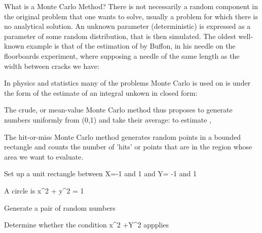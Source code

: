 What is a Monte Carlo Method?
There is not necessarily a random component in the original problem that one wants to solve, usually a problem for which there is no analytical solution. An unknown parameter (deterministic) is expressed as a parameter of some random distribution, that is then simulated. 
The oldest well-known example is that of the estimation of  by Buffon, in his needle on the floorboards experiment, where supposing a needle of the same length as the width between cracks we have: 


In physics and statistics many of the problems Monte Carlo is used on is under the form of the estimate of an integral unkown in closed form: 


The crude, or mean-value Monte Carlo method thus proposes to generate  numbers uniformly from (0,1) and take their average: to estimate , 


The hit-or-miss Monte Carlo method generates random points in a bounded rectangle and counts the number of 'hits' or points that are in the region whose area we want to evaluate. 


Set up a unit rectangle between X=-1 and 1 and Y= -1 and 1

A circle is x^2 + y^2 = 1

Generate a pair of random numbers

Determine whether the condition x^2 +Y^2   appplies


